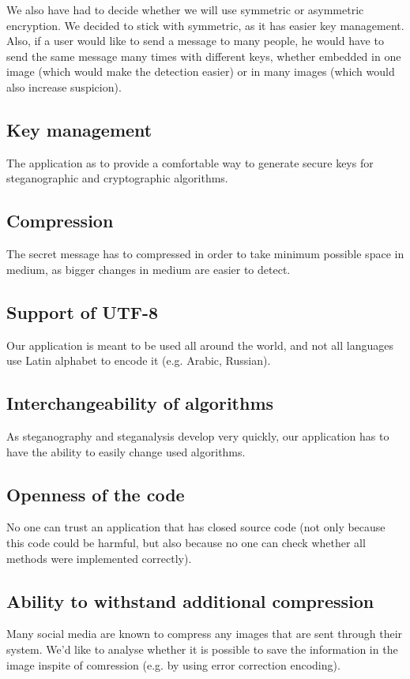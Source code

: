 We also have had to decide whether we will use symmetric or asymmetric
encryption. We decided to stick with symmetric, as it has easier key management.
Also, if a user would like to send a message to many people, he would have to
send the same message many times with different keys, whether embedded in one 
image (which would make the detection easier) or in many images (which would
also increase suspicion).

\subsection{Key management}
The application as to provide a comfortable way to generate secure keys for 
steganographic and cryptographic algorithms.

\subsection{Compression}
The secret message has to compressed in order to take minimum possible space in medium,
as bigger changes in medium are easier to detect.

\subsection{Support of UTF-8}
Our application is meant to be used all around the world, and not all languages use
Latin alphabet to encode it (e.g. Arabic, Russian). 

\subsection{Interchangeability of algorithms}
As steganography and steganalysis develop very quickly, our application
has to have the ability to easily change used algorithms.  

\subsection{Openness of the code}
No one can trust an application that has closed source code (not only because
this code could be harmful, but also because no one can check whether all
methods were implemented correctly).

\subsection{Ability to withstand additional compression}
Many social media are known to compress any images that are sent through
their system. We'd like to analyse whether it is possible to save the information
in the image inspite of comression (e.g. by using error correction encoding).

